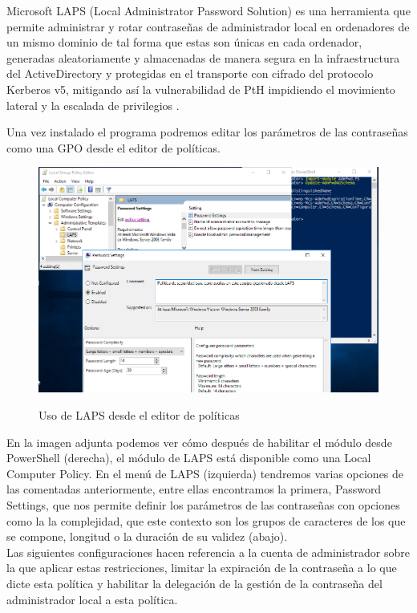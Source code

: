 \documentclass[10pt,a4paper]{article}
\begin{document}
\begin{enumerate}[label=\textbf{\alph*)}, start=6]
Microsoft LAPS (Local Administrator Password Solution) es una herramienta que permite administrar y rotar contraseñas de administrador local \cite{laps} en ordenadores de un mismo dominio de tal forma que estas son únicas en cada ordenador, generadas aleatoriamente y almacenadas de manera segura en la infraestructura del ActiveDirectory y protegidas en el transporte con cifrado del protocolo Kerberos v5, mitigando así la vulnerabilidad de PtH impidiendo el movimiento lateral y la escalada de privilegios \cite{mslaps}. 

Una vez instalado el programa podremos editar los parámetros de las contraseñas como una GPO desde el editor de políticas.

\begin{figure}[h!]
  \centering
  \includegraphics[scale=0.3]{laps.png}\\
  \label{fig:la}
  \caption{Uso de LAPS desde el editor de políticas}
\end{figure}

En la imagen adjunta podemos ver cómo después de habilitar el módulo desde PowerShell (derecha), el módulo de LAPS está disponible como una Local Computer Policy. En el menú de LAPS (izquierda) tendremos varias opciones de las comentadas anteriormente, entre ellas encontramos la primera, Password Settings, que nos permite definir los parámetros de las contraseñas con opciones como la la complejidad, que este contexto son los grupos de caracteres de los que se compone, longitud o la duración de su validez (abajo).\\
Las siguientes configuraciones hacen referencia a la cuenta de administrador sobre la que aplicar estas restricciones, limitar la expiración de la contraseña a lo que dicte esta política y habilitar la delegación de la gestión de la contraseña del administrador local a esta política.

\end{enumerate}
\end{document}
